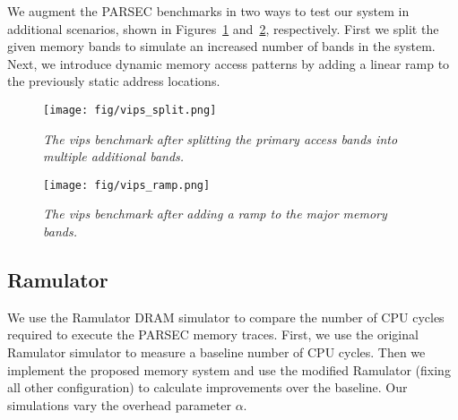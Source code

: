 We augment the PARSEC benchmarks in two ways to test our system in additional scenarios, shown in Figures~\ref{fig:vips_split} and~\ref{fig:vips_ramp}, respectively. First we split the given memory bands to simulate an increased number of bands in the system. Next, we introduce dynamic memory access patterns by adding a linear ramp to the previously static address locations. 

\begin{figure}[htbp]
		\texttt{[image: fig/vips\_split.png]}
		\caption{\it{The vips benchmark after splitting the primary access bands into multiple additional bands.}}
		\label{fig:vips_split}
\end{figure}


\begin{figure}[htbp]
		\texttt{[image: fig/vips\_ramp.png]}
		\caption{\it{The vips benchmark after adding a ramp to the major memory bands.}}
		\label{fig:vips_ramp}
\end{figure}


\subsection{Ramulator}

We use the Ramulator DRAM simulator to compare the number of CPU cycles required to execute the PARSEC memory traces. First, we use the original Ramulator simulator to measure a baseline number of CPU cycles. Then we implement the proposed memory system and use the modified Ramulator (fixing all other configuration) to calculate improvements over the baseline. Our simulations vary the overhead parameter $\alpha$.

%
